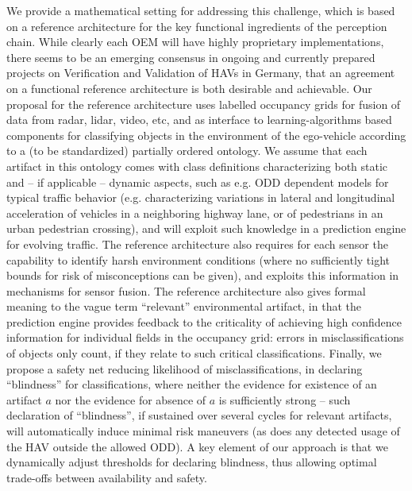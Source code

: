 We provide a mathematical setting for addressing this challenge, which is based on a reference architecture for the key functional ingredients of the perception chain. While clearly each OEM will have highly proprietary implementations, there seems to be an emerging consensus in ongoing and currently prepared projects on Verification and Validation of HAVs in Germany, that an agreement on a functional reference architecture is both desirable and achievable. Our proposal for the reference architecture uses labelled occupancy grids for fusion of data from radar, lidar, video, etc, and as interface to learning-algorithms based components for classifying objects in the environment of the ego-vehicle according to a (to be standardized) partially ordered ontology. We assume that each artifact in this ontology comes with class definitions characterizing both static and -- if applicable -- dynamic aspects, such as e.g. ODD dependent models for typical traffic behavior (e.g. characterizing variations in lateral and longitudinal acceleration of vehicles in a neighboring highway lane, or of pedestrians in an urban pedestrian crossing), and will exploit such knowledge in a prediction engine for evolving traffic. The reference architecture also requires for each sensor the capability to identify harsh environment conditions (where no sufficiently tight bounds for risk of misconceptions can be given), and exploits this information in mechanisms for sensor fusion. The reference architecture also gives formal meaning to the vague term \enquote{relevant} environmental artifact, in that the prediction engine provides feedback to the criticality of achieving high confidence information for individual fields in the occupancy grid: errors in misclassifications of objects only count, if they relate to such critical classifications. Finally, we propose a safety net reducing likelihood of misclassifications, in declaring \enquote{blindness} for classifications, where neither the evidence for existence of an artifact $a$ nor the evidence for absence of $a$ is sufficiently strong -- such declaration of \enquote{blindness}, if sustained over several cycles for relevant artifacts, will automatically induce minimal risk maneuvers (as does any detected usage of the HAV outside the allowed ODD). A key element of our approach is that we dynamically adjust thresholds for declaring blindness, thus allowing optimal trade-offs between availability and safety.

